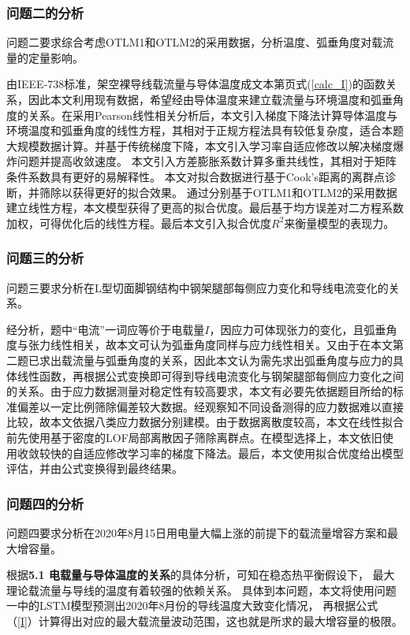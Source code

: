 \documentclass[withoutpreface,bwprint]{cumcmthesis}  %
\begin{document}
	\subsubsection{问题二的分析}
        问题二要求综合考虑OTLM1和OTLM2的采用数据，分析温度、弧垂角度对载流量的定量影响。
        
        由IEEE-738标准，架空裸导线载流量与导体温度成文本第\pageref{calc_I}页式(\ref{calc_I})的函数关系，因此本文利用现有数据，希望经由导体温度来建立载流量与环境温度和弧垂角度的关系。在采用Pearson线性相关分析后，本文引入梯度下降法计算导体温度与环境温度和弧垂角度的线性方程，其相对于正规方程法具有较低复杂度，适合本题大规模数据计算。并基于传统梯度下降，本文引入学习率自适应修改以解决梯度爆炸问题并提高收敛速度。
        本文引入方差膨胀系数计算多重共线性，其相对于矩阵条件系数具有更好的易解释性。
        本文对拟合数据进行基于Cook's距离的离群点诊断，并筛除以获得更好的拟合效果。
        通过分别基于OTLM1和OTLM2的采用数据建立线性方程，本文模型获得了更高的拟合优度。最后基于均方误差对二方程系数加权，可得优化后的线性方程。最后本文引入拟合优度$R^{2}$来衡量模型的表现力。
	
	\subsubsection{问题三的分析}
	问题三要求分析在L型切面脚钢结构中钢架腿部每侧应力变化和导线电流变化的关系。
 
        经分析，题中“电流”一词应等价于电载量$I$，因应力可体现张力的变化，且弧垂角度与张力线性相关，故本文可认为弧垂角度同样与应力线性相关。又由于在本文第二题已求出载流量与弧垂角度的关系，因此本文认为需先求出弧垂角度与应力的具体线性函数，再根据公式变换即可得到导线电流变化与钢架腿部每侧应力变化之间的关系。由于应力数据测量对稳定性有较高要求，本文有必要先依据题目所给的标准偏差以一定比例筛除偏差较大数据。经观察知不同设备测得的应力数据难以直接比较，故本文依据八类应力数据分别建模。由于数据离散度较高，本文在线性拟合前先使用基于密度的LOF局部离散因子筛除离群点。在模型选择上，本文依旧使用收敛较快的自适应修改学习率的梯度下降法。最后，本文使用拟合优度给出模型评估，并由公式变换得到最终结果。\label{p3_ana}
        

        \subsubsection{问题四的分析}
        问题四要求分析在2020年8月15日用电量大幅上涨的前提下的载流量增容方案和最大增容量。

        根据\textbf{5.1 电载量与导体温度的关系}的具体分析，可知在稳态热平衡假设下，
        最大理论载流量与导线的温度有着较强的依赖关系。
        具体到本问题，本文将使用问题一中的LSTM模型预测出2020年8月份的导线温度大致变化情况，
        再根据公式（\ref{I}）计算得出对应的最大载流量波动范围，这也就是所求的最大增容量的极限。
\end{document}
